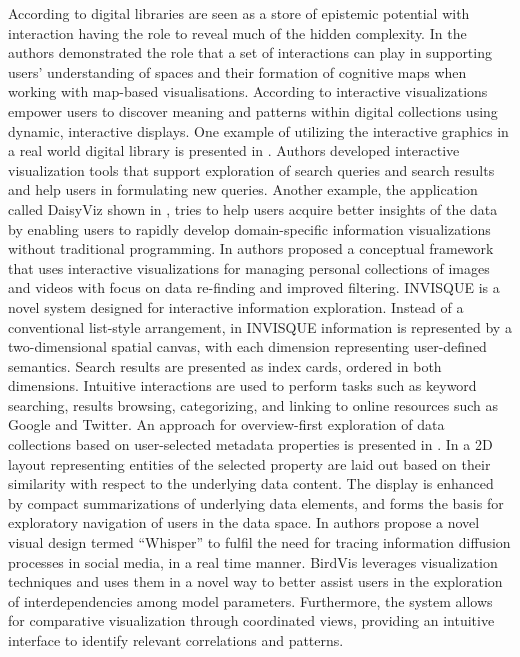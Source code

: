 \documentclass[amsthm,ebook]{saparticle}
\begin{document}
According to \citep{fast_interaction_2010} digital libraries are seen as a store of epistemic potential with interaction having
the role to reveal much of the hidden complexity. In \citep{buchel_making_2014} the authors demonstrated the role that a
set of interactions can play in supporting users' understanding of spaces and their formation of cognitive maps when
working with map-based visualisations. According to \citep{algee_viewshare_2012} interactive visualizations empower users to
discover meaning and patterns within digital collections using dynamic, interactive displays. One example of utilizing
the interactive graphics in a real world digital library is presented in \citep{hienert_integrating_2012}. Authors developed
interactive visualization tools that support exploration of search queries and search results and help users in
formulating new queries. Another example, the application called DaisyViz shown in \citep{ren_daisyviz:_2010}, tries to help
users acquire better insights of the data by enabling users to rapidly develop domain-specific information
visualizations without traditional programming. In \citep{nasar_conceptual_2011} authors proposed a conceptual framework that
uses interactive visualizations for managing personal collections of images and videos with focus on data re-finding
and improved filtering. INVISQUE \citep{wong_invisque:_2011} is a novel system designed for interactive information
exploration. Instead of a conventional list-style arrangement, in INVISQUE information is represented by a
two-dimensional spatial canvas, with each dimension representing user-defined semantics. Search results are presented
as index cards, ordered in both dimensions. Intuitive interactions are used to perform tasks such as keyword searching,
results browsing, categorizing, and linking to online resources such as Google and Twitter. An approach for
overview-first exploration of data collections based on user-selected metadata properties is presented in \citep{bernard_content-based_2012}. In a 2D layout representing entities of the selected property are laid out based on their similarity with
respect to the underlying data content. The display is enhanced by compact summarizations of underlying data elements,
and forms the basis for exploratory navigation of users in the data space. In \citep{cao_whisper:_2012} authors propose a
novel visual design termed ``Whisper'' to fulfil the need for tracing information diffusion processes in social media, in
a real time manner. BirdVis \citep{ferreira_birdvis:_2011} leverages visualization techniques and uses them in a novel way to
better assist users in the exploration of interdependencies among model parameters. Furthermore, the system allows for
comparative visualization through coordinated views, providing an intuitive interface to identify relevant correlations
and patterns. 
\end{document}

